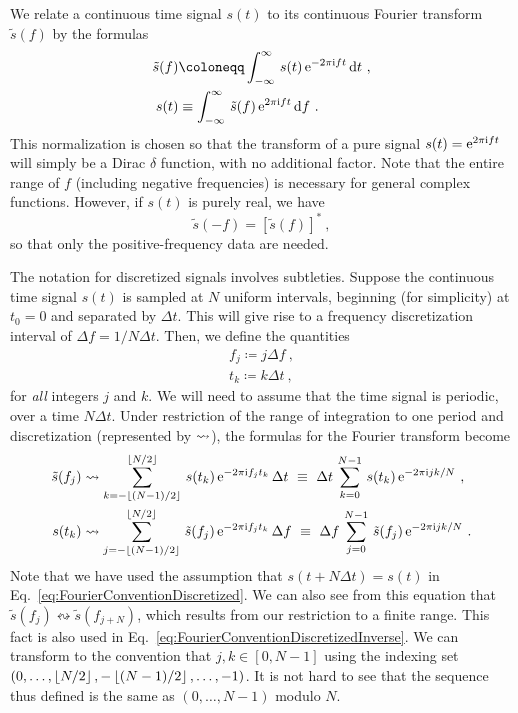 \documentclass[aps, prd, amsfonts, amssymb, amsmath, %
nofootinbib]{revtex4}
\begin{document}
We relate a continuous time signal $s(t)$ to its continuous Fourier
transform $\tilde{s}(f)$ by the formulas
\begin{align}
  \label{eq:FourierConventionContinuous}
  \tilde{s}(f) &\coloneqq \int_{-\infty}^{\infty}\, s(t)\, \e^{-2\pi
    \i f t}\, \d t\ ,
  \\
  \label{eq:FourierConventionContinuousInverse}
  s(t) &\equiv \int_{-\infty}^{\infty}\, \tilde{s}(f)\, \e^{2 \pi \i f
    t}\, \d f\ .
\end{align}
This normalization is chosen so that the transform of a pure signal
$s(t) = \mathrm{e}^{2\pi\mathrm{i} f t}$ will simply be a Dirac $\delta$ function,
with no additional factor.  Note that the entire range of $f$
(including negative frequencies) is necessary for general complex
functions.  However, if $s(t)$ is purely real, we have
\begin{equation}
  \label{eq:RealFourierTransformCondition}
  \tilde{s}(-f) = \left[\tilde{s}(f)\right]^{\ast}\ ,
\end{equation}
so that only the positive-frequency data are needed.

The notation for discretized signals involves subtleties.  Suppose the
continuous time signal $s(t)$ is sampled at $N$ uniform intervals,
beginning (for simplicity) at $t_{0}=0$ and separated by $\Delta t$.
This will give rise to a frequency discretization interval of $\Delta
f = 1/N\Delta t$.  Then, we define the quantities
\begin{gather}
  \label{eq:DiscreteFrequencies}
  f_{j} \coloneqq j \Delta f\ , \\
  \label{eq:DiscreteTimes}
  t_{k} \coloneqq k \Delta t\ ,
\end{gather}
for \emph{all} integers $j$ and $k$.  We will need to assume that the
time signal is periodic, over a time $N\Delta t$.  Under restriction
of the range of integration to one period and discretization
(represented by $\rightsquigarrow$), the formulas for the Fourier transform
become
\begin{align}
  \label{eq:FourierConventionDiscretized}
  \tilde{s}(f_{j}) &\rightsquigarrow
  \sum_{k=-\left\lfloor{(N-1)/2}\right\rfloor}^{\left\lfloor{N/2}\right\rfloor}\, s(t_{k})\, \mathrm{e}^{-2\pi\mathrm{i}
    f_{j} t_{k}}\, \Delta t \ \equiv\ \Delta t\, \sum_{k=0}^{N-1}\,
  s(t_{k})\, \mathrm{e}^{-2\pi\mathrm{i} jk/N}\ ,
  \\
  \label{eq:FourierConventionDiscretizedInverse}
  s(t_{k}) &\rightsquigarrow \sum_{j=-\left\lfloor{(N-1)/2}\right\rfloor}^{\left\lfloor{N/2}\right\rfloor}\,
  \tilde{s}(f_{j})\, \mathrm{e}^{-2\pi\mathrm{i} f_{j} t_{k}}\, \Delta f \ \equiv\
  \Delta f\, \sum_{j=0}^{N-1}\, \tilde{s}(f_{j})\, \mathrm{e}^{-2\pi\mathrm{i} jk/N}\
  .
\end{align}
Note that we have used the assumption that $s(t+N\Delta t) = s(t)$ in
Eq.~\eqref{eq:FourierConventionDiscretized}.  We can also see from
this equation that $\tilde{s}(f_{j}) \leftrightsquigarrow
\tilde{s}(f_{j+N})$, which results from our restriction to a finite
range.  This fact is also used in
Eq.~\eqref{eq:FourierConventionDiscretizedInverse}.  We can transform
to the convention that $j,k \in [0, N-1]$ using the indexing set $(0,
\ldots, \left\lfloor{N/2}\right\rfloor, -\left\lfloor{(N-1)/2}\right\rfloor, \ldots, -1)$.  It is not hard
to see that the sequence thus defined is the same as $(0, \ldots,
N-1)$ modulo $N$.
\end{document}
